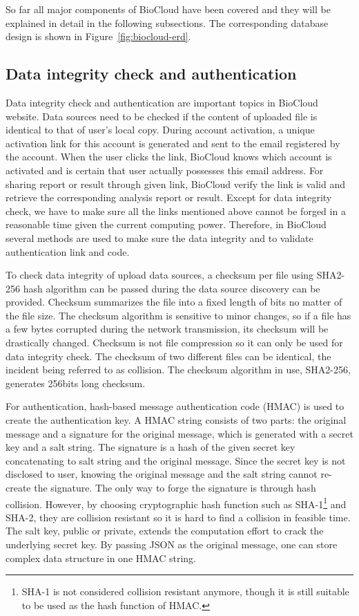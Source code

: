 

So far all major components of BioCloud have been covered and they will be
explained in detail in the following subsections. The corresponding database
design is shown in Figure~\ref{fig:biocloud-erd}.


\subsection{Data integrity check and authentication}

Data integrity check and authentication are important topics in BioCloud
website. Data sources need to be checked if the content of uploaded file is
identical to that of user's local copy. During account activation, a unique
activation link for this account is generated and sent to the email registered
by the account. When the user clicks the link, BioCloud knows which account is
activated and is certain that user actually possesses this email address. For
sharing report or result through given link, BioCloud verify the link is valid
and retrieve the corresponding analysis report or result. Except for data
integrity check, we have to make sure all the links mentioned above cannot be
forged in a reasonable time given the current computing power. Therefore, in
BioCloud several methods are used to make sure the data integrity and to
validate authentication link and code.

To check data integrity of upload data sources, a checksum per file using
SHA2-256 hash algorithm can be passed during the data source discovery can be
provided. Checksum summarizes the file into a fixed length of bits no matter of
the file size. The checksum algorithm is sensitive to minor changes, so if a
file has a few bytes corrupted during the network transmission, its checksum
will be drastically changed. Checksum is not file compression so it can only be
used for data integrity check. The checksum of two different files can be
identical, the incident being referred to as collision. The checksum algorithm
in use, SHA2-256, generates 256bits long checksum.

For authentication, hash-based message authentication code (HMAC) is used to
create the authentication key. A HMAC string consists of two parts: the
original message and a signature for the original message, which is generated
with a secret key and a salt string. The signature is a hash of the given
secret key concatenating to salt string and the original message. Since the
secret key is not disclosed to user, knowing the original message and the salt
string cannot re-create the signature. The only way to forge the signature is
through hash collision. However, by choosing cryptographic hash function such
as SHA-1\footnote{ SHA-1 is not considered collision resistant anymore, though
    it is still suitable to be used as the hash function of HMAC.  } and SHA-2,
they are collision resistant so it is hard to find a collision in feasible
time. The salt key, public or private, extends the computation effort to crack
the underlying secret key. By passing JSON as the original message, one can
store complex data structure in one HMAC string.


